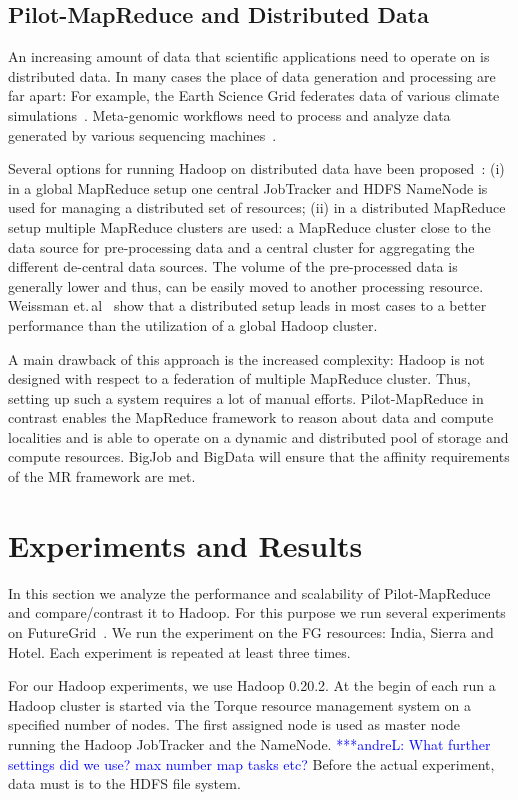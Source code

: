 \documentclass{acm_proc_article-sp}
\newcommand{\alnote}[1]{ {\textcolor{blue} { ***andreL: #1 }}}
\newcommand{\alnote}[1]{}
\newcommand{\pilotmapreduce}{Pilot-MapReduce\xspace}
\begin{document}
\subsection{Pilot-MapReduce and Distributed Data}

An increasing amount of data that scientific applications need to operate on 
is distributed data. In many cases the place of data 
generation and processing are far apart: For example, the Earth Science Grid 
federates data of various climate simulations~\cite{ESG}. Meta-genomic 
workflows need to process and analyze data generated by various sequencing 
machines~\cite{Jha:2011fk}.

Several options for running Hadoop on distributed data have been
proposed~\cite{weissman-mr-11}: (i) in a global MapReduce setup one central
JobTracker and HDFS NameNode is used for managing a distributed set of
resources; (ii) in a distributed MapReduce setup multiple MapReduce clusters
are used: a MapReduce cluster close to the data source for pre-processing data
and a central cluster for aggregating the different de-central data sources.
The volume of the pre-processed data is generally lower and thus, can be
easily moved to another processing resource. Weissman
et.\,al~\cite{weissman-mr-11} show that a distributed setup leads in most
cases to a better performance than the utilization of a global Hadoop cluster.

A main drawback of this approach is the increased complexity: Hadoop is not 
designed with respect to a federation of multiple MapReduce cluster. Thus, 
setting up such a system requires a lot of manual efforts. \pilotmapreduce in 
contrast enables the MapReduce framework to reason about data and compute 
localities and is able to operate on a dynamic and distributed pool of storage 
and compute resources. BigJob and BigData will ensure that the affinity 
requirements of the MR framework are met.


\section{Experiments and Results}

In this section we analyze the performance and scalability of \pilotmapreduce
and compare/contrast it to Hadoop. For this purpose we run several experiments
on FutureGrid~\cite{fg}. We run the experiment on the FG resources: India, 
Sierra and Hotel. Each experiment is repeated at least three times.

For our Hadoop experiments, we use Hadoop 0.20.2. At the begin of each run a 
Hadoop cluster is started via the Torque resource management system on a
specified number of nodes. The first assigned node is used as master node
running the Hadoop JobTracker and the NameNode. \alnote{What further settings
did we use? max number map tasks etc?} Before the actual experiment, data must
is to the HDFS file system.
\end{document}
